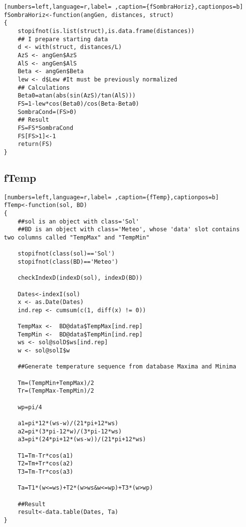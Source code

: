 \begin{lstlisting}[numbers=left,language=r,label= ,caption={fSombraHoriz},captionpos=b]
fSombraHoriz<-function(angGen, distances, struct)
{
    stopifnot(is.list(struct),is.data.frame(distances))
    ## I prepare starting data 	
    d <- with(struct, distances/L)
    AzS <- angGen$AzS
    AlS <- angGen$AlS
    Beta <- angGen$Beta
    lew <- d$Lew #It must be previously normalized
    ## Calculations
    Beta0=atan(abs(sin(AzS)/tan(AlS)))
    FS=1-lew*cos(Beta0)/cos(Beta-Beta0)
    SombraCond=(FS>0)
    ## Result
    FS=FS*SombraCond
    FS[FS>1]<-1
    return(FS)
}
\end{lstlisting}
\subsection{fTemp}
\label{sec:org9454252}
\label{subsec:ftemp}
\begin{lstlisting}[numbers=left,language=r,label= ,caption={fTemp},captionpos=b]
fTemp<-function(sol, BD)
{
    ##sol is an object with class='Sol'
    ##BD is an object with class='Meteo', whose 'data' slot contains two columns called "TempMax" and "TempMin"

    stopifnot(class(sol)=='Sol')
    stopifnot(class(BD)=='Meteo')

    checkIndexD(indexD(sol), indexD(BD))

    Dates<-indexI(sol)	
    x <- as.Date(Dates)
    ind.rep <- cumsum(c(1, diff(x) != 0))

    TempMax <-  BD@data$TempMax[ind.rep]
    TempMin <-  BD@data$TempMin[ind.rep]
    ws <- sol@solD$ws[ind.rep]
    w <- sol@solI$w

    ##Generate temperature sequence from database Maxima and Minima

    Tm=(TempMin+TempMax)/2
    Tr=(TempMax-TempMin)/2

    wp=pi/4

    a1=pi*12*(ws-w)/(21*pi+12*ws)
    a2=pi*(3*pi-12*w)/(3*pi-12*ws)
    a3=pi*(24*pi+12*(ws-w))/(21*pi+12*ws)

    T1=Tm-Tr*cos(a1)
    T2=Tm+Tr*cos(a2)
    T3=Tm-Tr*cos(a3)

    Ta=T1*(w<=ws)+T2*(w>ws&w<=wp)+T3*(w>wp)

    ##Result
    result<-data.table(Dates, Ta)
}
\end{lstlisting}
